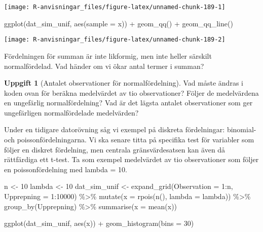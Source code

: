 \documentclass[
]{book}
\newenvironment{Shaded}{\begin{snugshade}}{\end{snugshade}}
\newcommand{\AttributeTok}[1]{\textcolor[rgb]{0.77,0.63,0.00}{#1}}
\newcommand{\DecValTok}[1]{\textcolor[rgb]{0.00,0.00,0.81}{#1}}
\newcommand{\FunctionTok}[1]{\textcolor[rgb]{0.00,0.00,0.00}{#1}}
\newcommand{\NormalTok}[1]{#1}
\newcommand{\OtherTok}[1]{\textcolor[rgb]{0.56,0.35,0.01}{#1}}
\newcommand{\SpecialCharTok}[1]{\textcolor[rgb]{0.00,0.00,0.00}{#1}}
\theoremstyle{definition}
\theoremstyle{definition}
\theoremstyle{definition}
\newtheorem{exercise}{Uppgift}[chapter]
\theoremstyle{definition}
\theoremstyle{remark}
\begin{document}
\begin{center}\texttt{[image: R-anvisningar\_files/figure-latex/unnamed-chunk-189-1]} \end{center}

\begin{Shaded}
\begin{Highlighting}[]
\FunctionTok{ggplot}\NormalTok{(dat\_sim\_unif, }\FunctionTok{aes}\NormalTok{(}\AttributeTok{sample =}\NormalTok{ x)) }\SpecialCharTok{+} \FunctionTok{geom\_qq}\NormalTok{() }\SpecialCharTok{+} \FunctionTok{geom\_qq\_line}\NormalTok{()}
\end{Highlighting}
\end{Shaded}

\begin{center}\texttt{[image: R-anvisningar\_files/figure-latex/unnamed-chunk-189-2]} \end{center}

Fördelningen för summan är inte likformig, men inte heller särskilt normalfördelad. Vad händer om vi ökar antal termer i summan?

\begin{exercise}[Antalet observationer för normalfördelning]
Vad måste ändras i koden ovan för beräkna medelvärdet av tio observationer? Följer de medelvärdena en ungefärlig normalfördelning? Vad är det lägsta antalet observationer som ger ungefärligen normalfördelade medelvärden?
\end{exercise}

Under en tidigare datorövning såg vi exempel på diskreta fördelningar: binomial- och poissonfördelningarna. Vi ska senare titta på specifika test för variabler som följer en diskret fördelning, men centrala gränsvärdesatsen kan även då rättfärdiga ett t-test. Ta som exempel medelvärdet av tio observationer som följer en poissonfördelning med lambda = 10.

\begin{Shaded}
\begin{Highlighting}[]
\NormalTok{n }\OtherTok{\textless{}{-}} \DecValTok{10}
\NormalTok{lambda }\OtherTok{\textless{}{-}} \DecValTok{10}
\NormalTok{dat\_sim\_unif }\OtherTok{\textless{}{-}} \FunctionTok{expand\_grid}\NormalTok{(}\AttributeTok{Observation =} \DecValTok{1}\SpecialCharTok{:}\NormalTok{n, }\AttributeTok{Upprepning =} \DecValTok{1}\SpecialCharTok{:}\DecValTok{10000}\NormalTok{) }\SpecialCharTok{\%\textgreater{}\%} 
  \FunctionTok{mutate}\NormalTok{(}\AttributeTok{x =} \FunctionTok{rpois}\NormalTok{(}\FunctionTok{n}\NormalTok{(), }\AttributeTok{lambda =}\NormalTok{ lambda)) }\SpecialCharTok{\%\textgreater{}\%} 
  \FunctionTok{group\_by}\NormalTok{(Upprepning) }\SpecialCharTok{\%\textgreater{}\%} 
  \FunctionTok{summarise}\NormalTok{(}\AttributeTok{x =} \FunctionTok{mean}\NormalTok{(x))}

\FunctionTok{ggplot}\NormalTok{(dat\_sim\_unif, }\FunctionTok{aes}\NormalTok{(x)) }\SpecialCharTok{+} \FunctionTok{geom\_histogram}\NormalTok{(}\AttributeTok{bins =} \DecValTok{30}\NormalTok{)}
\end{Highlighting}
\end{Shaded}
\end{document}
